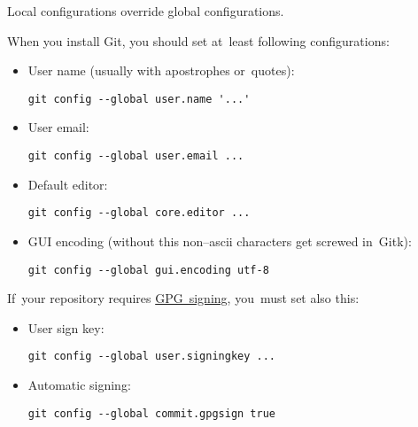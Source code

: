 \warning Local configurations override global configurations.

\label{gitbasicconfiguration}
When you install Git, you should set at~least following configurations:
\begin{itemize}
    \item User name (usually with apostrophes or~quotes):
        \begin{lstlisting}[frame=no, gobble=12]
            git config --global user.name '...'
        \end{lstlisting}
    \item User email:
        \begin{lstlisting}[frame=no, gobble=12]
            git config --global user.email ...
        \end{lstlisting}
    \item Default editor:
        \begin{lstlisting}[frame=no, gobble=12]
            git config --global core.editor ...
        \end{lstlisting}
    \item GUI encoding (without this non--ascii characters get screwed in~Gitk):
        \begin{lstlisting}[frame=no, gobble=12]
            git config --global gui.encoding utf-8
        \end{lstlisting}
\end{itemize}
\noindent If~your repository requires \hyperref[gitgpg]{GPG~signing}, you~must set also this:
\begin{itemize}
    \item User sign key:
        \begin{lstlisting}[frame=no, gobble=12]
            git config --global user.signingkey ...
        \end{lstlisting}
    \item Automatic signing:
        \begin{lstlisting}[frame=no, gobble=12]
            git config --global commit.gpgsign true
        \end{lstlisting}
\end{itemize}

\label{gitshow}





